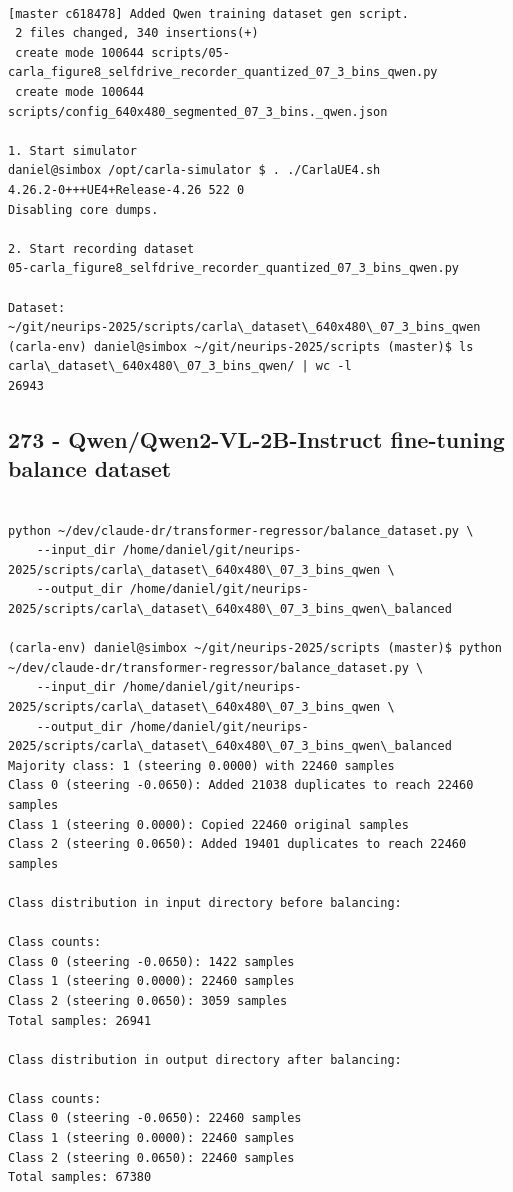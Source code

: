 \begin{verbatim}

[master c618478] Added Qwen training dataset gen script.
 2 files changed, 340 insertions(+)
 create mode 100644 scripts/05-carla_figure8_selfdrive_recorder_quantized_07_3_bins_qwen.py
 create mode 100644 scripts/config_640x480_segmented_07_3_bins._qwen.json

1. Start simulator
daniel@simbox /opt/carla-simulator $ . ./CarlaUE4.sh 
4.26.2-0+++UE4+Release-4.26 522 0
Disabling core dumps.

2. Start recording dataset
05-carla_figure8_selfdrive_recorder_quantized_07_3_bins_qwen.py

Dataset:
~/git/neurips-2025/scripts/carla\_dataset\_640x480\_07_3_bins_qwen
(carla-env) daniel@simbox ~/git/neurips-2025/scripts (master)$ ls carla\_dataset\_640x480\_07_3_bins_qwen/ | wc -l
26943

\end{verbatim}

\subsection{273 - Qwen/Qwen2-VL-2B-Instruct fine-tuning balance dataset}
\label{app_res:273}

\begin{verbatim}

python ~/dev/claude-dr/transformer-regressor/balance_dataset.py \
    --input_dir /home/daniel/git/neurips-2025/scripts/carla\_dataset\_640x480\_07_3_bins_qwen \
    --output_dir /home/daniel/git/neurips-2025/scripts/carla\_dataset\_640x480\_07_3_bins_qwen\_balanced

(carla-env) daniel@simbox ~/git/neurips-2025/scripts (master)$ python ~/dev/claude-dr/transformer-regressor/balance_dataset.py \
    --input_dir /home/daniel/git/neurips-2025/scripts/carla\_dataset\_640x480\_07_3_bins_qwen \
    --output_dir /home/daniel/git/neurips-2025/scripts/carla\_dataset\_640x480\_07_3_bins_qwen\_balanced
Majority class: 1 (steering 0.0000) with 22460 samples
Class 0 (steering -0.0650): Added 21038 duplicates to reach 22460 samples
Class 1 (steering 0.0000): Copied 22460 original samples
Class 2 (steering 0.0650): Added 19401 duplicates to reach 22460 samples

Class distribution in input directory before balancing:

Class counts:
Class 0 (steering -0.0650): 1422 samples
Class 1 (steering 0.0000): 22460 samples
Class 2 (steering 0.0650): 3059 samples
Total samples: 26941

Class distribution in output directory after balancing:

Class counts:
Class 0 (steering -0.0650): 22460 samples
Class 1 (steering 0.0000): 22460 samples
Class 2 (steering 0.0650): 22460 samples
Total samples: 67380
    
\end{verbatim}

